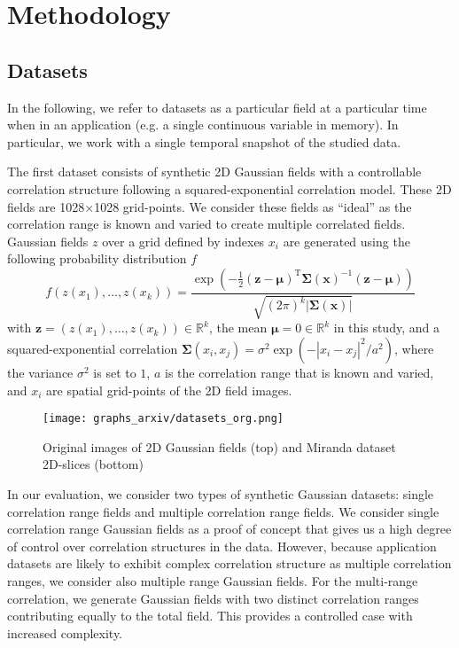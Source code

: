 \documentclass[conference]{IEEEtran}
\begin{document}
\section{Methodology}

\subsection{Datasets}\label{sec:data}
In the following, we refer to datasets as a particular field at a  particular time when in an application (e.g. a single continuous  variable  in memory). In particular,  we work with a single temporal snapshot of the studied data. 

The first dataset consists of synthetic 2D Gaussian fields with a controllable correlation structure following  a squared-exponential correlation model. These 2D fields are 1028$\times$1028 grid-points. 
We  consider these fields as ``ideal'' as the correlation range is known and varied to create multiple correlated fields. Gaussian fields $z$ over a grid defined by indexes $x_i$ are generated using the following probability distribution $f$
\begin{equation}\label{eq:pdf_gauss}
    f(z(x_{1}),\ldots ,z(x_{k}))=\frac {\exp \left(-{\frac {1}{2}}({\mathbf {z} }-{\boldsymbol {\mu }})^{\mathrm {T} }{\boldsymbol {\Sigma }}(\mathbf {x})^{-1}({\mathbf {z} }-{\boldsymbol {\mu }})\right)}{\sqrt {(2\pi )^{k}|{\boldsymbol {\Sigma }}(\mathbf {x})|}}
\end{equation}
with $\mathbf {z}=(z(x_{1}),\ldots ,z(x_{k}))\in \mathbb{R}^{k}$, the mean ${\boldsymbol\mu = 0} \in \mathbb{R}^{k}$ in this study, and a squared-exponential correlation ${\boldsymbol {\Sigma }}(x_i,x_j) = \sigma^2 \exp( -|x_i - x_j|^2/a^2 )$, where the variance $\sigma^2$ is set to $1$, $a$ is the correlation range that is known and varied, and $x_i$ are spatial grid-points of the 2D field images. 
%
\begin{figure}
\centering
\texttt{[image: graphs\_arxiv/datasets\_org.png]}
\vspace{-10pt}
\caption{Original images of 2D Gaussian fields (top) and Miranda dataset 2D-slices (bottom)}
\label{original_slices}
\vspace{-10pt}
\end{figure}
%

In our evaluation, we consider two types of synthetic Gaussian datasets: single correlation range fields and multiple correlation range fields.
We consider single correlation range Gaussian fields as a proof of concept that gives us a high degree of control over correlation structures in the data.
However, because application datasets are likely to exhibit complex correlation structure as multiple correlation ranges, we consider also multiple range Gaussian fields.
For the multi-range correlation, we generate Gaussian fields with two distinct correlation ranges contributing equally to the total field.
This provides a controlled case with increased complexity. 
\end{document}
